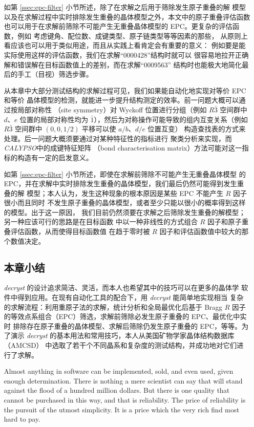 如第 \ref{ssec:epc-filter} 小节所述，除了在求解之后用于筛除发生原子重叠的解
模型以及在求解过程中实时排除发生重叠的晶体模型之外，本文中的原子重叠评估函数
也可以用于在求解前筛除不可能产生无重叠晶体模型的 EPC。更复杂的评估函数，例如
考虑键角、配位数、成键类型、原子链类型等等因素的那些\parencite{li2012}，
从原则上看应该也可以用于类似用途，而且从实践上看肯定会有重要的意义：
例如要是能实际使用这样的评估函数，我们在求解“0000428”结构时就可以
很容易地拉开正确解和错误解在目标函数值上的差别，而在求解“0009563”
结构时也能极大地简化最后的手工（目视）筛选步骤。

从本章中大部分测试结构的求解过程可见，我们如果能自动化地实现对等价 EPC 和等价
晶体模型的检测，就能进一步提升结构测定的效率。前一问题大概可以通过按局部对称性
（site symmetry）对 Wyckoff 位置进行分组（例如 $R\bar3$ 空间群中 $d$、$e$
位置的局部对称性均为 $\bar1$），然后为对称操作可能导致的组内互变关系（例如
$R\bar3$ 空间群中 $(0, 0, 1/2)$ 平移可以使 $a/b$、$d/e$ 位置互变）
构造查找表的方式来处理。后一问题大概须要通过对某种特征性的指标进行
聚类分析来实现，而 \emph{CALYPSO}\parencite{wang2012}中的成键特征矩阵
（bond characterisation matrix）方法可能对这一指标的构造有一定的启发意义。

如第 \ref{ssec:epc-filter} 小节所述，即使在求解前筛除不可能产生无重叠晶体模型
的 EPC，并在求解中实时排除发生重叠的晶体模型，我们最后仍然可能得到发生重叠的解
模型；本人认为，发生这种现象的根本原因是某些 EPC 不能产生 $R$ 因子很小而且同时
不发生原子重叠的晶体模型，或者至少只能以很小的概率得到这样的模型。出于这一原因，
我们目前仍然须要在求解之后筛除发生重叠的解模型；另一种应该可行的思路是在目标函数
中以一种非线性的方式组合 $R$ 因子和原子重叠评估函数，从而使得目标函数值
在趋于零时被 $R$ 因子和评估函数值中较大的那个数值决定。

\subsection{本章小结}

\emph{decryst} 的设计追求简洁、灵活，而本人也希望其中的技巧可以在更多的晶体学
软件中得到应用。在现有自动化工具的配合下，用 \emph{decryst} 能简单地实现相当
复杂的求解流程：利用重原子法的求解，统计分析和全局最优化后基于 Bragg $R$
因子的等效点系组合（EPC）筛选，求解前筛除必发生原子重叠的 EPC、最优化中实时
排除存在原子重叠的晶体模型、求解后筛除仍发生原子重叠的 EPC，等等。为了演示
\emph{decryst} 的基本用法和常用技巧，本人从美国矿物学家晶体结构数据库（AMCSD）
中选取了若干个不同晶系和复杂度的测试结构，并成功地对它们进行了求解。

\begin{rquote}{0.1\textwidth}
	Almost anything in software can be implemented, sold, and even used, given
	enough determination.  There is nothing a mere scientist can say that will
	stand against the flood of a hundred million dollars.  But there is one
	quality that cannot be purchased in this way, and that is reliability.
	The price of reliability is the pursuit of the utmost simplicity.
	It is a price which the very rich find most hard to pay.
\end{rquote}

